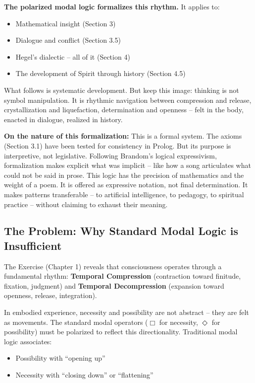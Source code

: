 \documentclass[12pt]{book}
\begin{document}
\textbf{The polarized modal logic formalizes this rhythm.} It applies to:
\begin{itemize}
\item Mathematical insight (Section 3)
\item Dialogue and conflict (Section 3.5)
\item Hegel's dialectic -- all of it (Section 4)
\item The development of Spirit through history (Section 4.5)
\end{itemize}

What follows is systematic development. But keep this image: thinking is not symbol manipulation. It is rhythmic navigation between compression and release, crystallization and liquefaction, determination and openness -- felt in the body, enacted in dialogue, realized in history.

\textbf{On the nature of this formalization:} This is a formal system. The axioms (Section 3.1) have been tested for consistency in Prolog. But its purpose is interpretive, not legislative. Following Brandom's logical expressivism, formalization makes explicit what was implicit -- like how a song articulates what could not be said in prose. This logic has the precision of mathematics and the weight of a poem. It is offered as expressive notation, not final determination. It makes patterns transferable -- to artificial intelligence, to pedagogy, to spiritual practice -- without claiming to exhaust their meaning.

\subsection{The Problem: Why Standard Modal Logic is Insufficient}

The Exercise (Chapter 1) reveals that consciousness operates through a fundamental rhythm: \textbf{Temporal Compression} (contraction toward finitude, fixation, judgment) and \textbf{Temporal Decompression} (expansion toward openness, release, integration).

In embodied experience, necessity and possibility are not abstract -- they are felt as movements. The standard modal operators ($\Box$ for necessity, $\Diamond$ for possibility) must be polarized to reflect this directionality. Traditional modal logic associates:

\begin{itemize}
\item Possibility with ``opening up''
\item Necessity with ``closing down'' or ``flattening''
\end{itemize}
\end{document}
